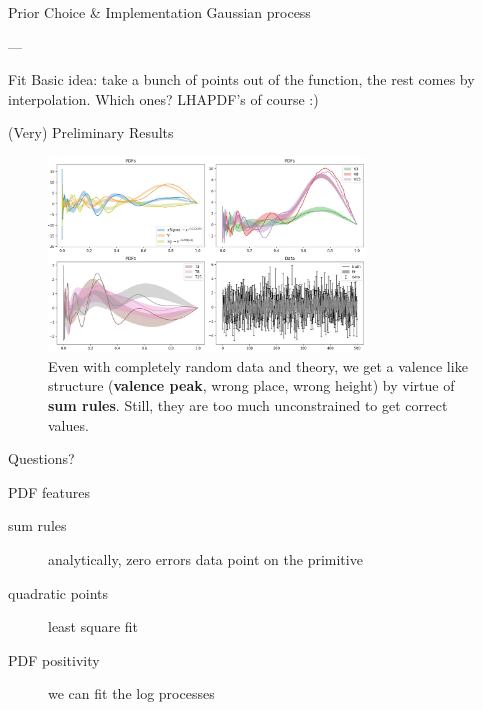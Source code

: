 \documentclass[9pt]{beamer}
\begin{document}
\begin{frame}{Prior Choice \& Implementation}
    Gaussian process
    
    ---

    Fit Basic idea: take a bunch of points out of the function, the rest comes
    by interpolation. Which ones? LHAPDF's of course :)
\end{frame}


\begin{frame}{(Very) Preliminary Results}
    \vspace*{10pt}
    \begin{figure}
        \centering
        \includegraphics[width=0.75\textwidth]{fit-pdf}
        \caption{
            Even with completely random data and theory, we get a valence like
            structure (\textbf{valence peak}, wrong place, wrong height) by
            virtue of \textbf{sum rules}. Still, they are too much
            unconstrained to get correct values.
        }
    \end{figure}
\end{frame}

\begin{frame}[standout]
    Questions?
\end{frame}

\appendix

\begin{frame}{PDF features}
    \begin{description}
        \item[sum rules] analytically, zero errors data point on the primitive
        \item[quadratic points] least square fit
        \item[PDF positivity] we can fit the log processes
    \end{description}
\end{frame}
\end{document}
